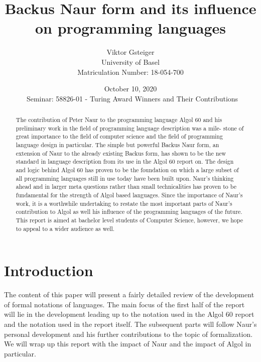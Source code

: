 \documentclass{article}
\author{Viktor Gsteiger \\ University of Basel \\ Matriculation Number: 18-054-700}
\title{Backus Naur form and its influence on programming languages}
\date{October 10, 2020 \\\ Seminar: 58826-01 - Turing Award Winners and Their Contributions}
\begin{document}
\maketitle

\begin{abstract}
	The contribution of Peter Naur to the programming language Algol 60 and his preliminary work in the field of programming language description was a mile- stone of great importance to the field of computer science and the field of programming language design in particular. The simple but powerful Backus Naur form, an extension of Naur to the already existing Backus form, has shown to be the new standard in language description from its use in the Algol 60 report on. The design and logic behind Algol 60 has proven to be the foundation on which a large subset of all programming languages still in use today have been built upon. Naur’s thinking ahead and in larger meta questions rather than small technicalities has proven to be fundamental for the strength of Algol based languages. Since the importance of Naur’s work, it is a worthwhile undertaking to restate the most important parts of Naur’s contribution to Algol as well his influence of the programming languages of the future. This report is aimed at bachelor level students of Computer Science, however, we hope to appeal to a wider audience as well.
\end{abstract}

\newpage

\section{Introduction}
The content of this paper will present a fairly detailed review of the development of formal notations of languages. The main focus of the first half of the report will lie in the development leading up to the notation used in the Algol 60 report and the notation used in the report itself. The subsequent parts will follow Naur’s personal development and his further contributions to the topic of formalization. We will wrap up this report with the impact of Naur and the impact of Algol in particular.
\end{document}
